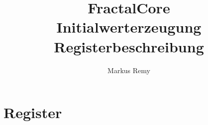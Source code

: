 \documentclass[
    a4paper,
    ngerman,
    fontsize=11pt,
    bibliography=totoc,
    listof=totoc,
    numbers=noendperiod,
    DIV=calc
]{scrartcl}
\title{\Huge FractalCore\\[0.5em]\huge Initialwerterzeugung\\[0.5em]\Large Registerbeschreibung}
\author{Markus Remy}
\begin{document}
    \maketitle
    \newpage

    \tableofcontents
    \clearpage

    \begin{registerblock}
        
    \end{registerblock}

    \section{Register}

    \begin{registerblock}
        
    \end{registerblock}
    \begin{registerblock}
        
    \end{registerblock}
    \begin{registerblock}
        
    \end{registerblock}
    \begin{registerblock}
        
    \end{registerblock}
    \begin{registerblock}
        
    \end{registerblock}
    \begin{registerblock}
        
    \end{registerblock}
    \begin{registerblock}
        
    \end{registerblock}
    \begin{registerblock}
        
    \end{registerblock}
    \begin{registerblock}
        
    \end{registerblock}
    \begin{registerblock}
        
    \end{registerblock}
    \begin{registerblock}
        
    \end{registerblock}
\end{document}
